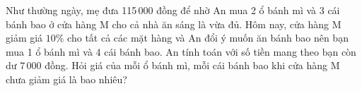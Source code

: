 \begin{bt}[1,0 điểm]
Như thường ngày, mẹ đưa 115\,000 đồng để nhờ An mua 2 ổ bánh mì và 3 cái bánh bao ở cửa hàng M cho cả nhà ăn sáng là vừa đủ. Hôm nay, cửa hàng M giảm giá $10 \%$ cho tất cả các mặt hàng và An đổi ý muốn ăn bánh bao nên bạn mua 1 ổ bánh mì và 4 cái bánh bao. An tính toán với số tiền mang theo bạn còn dư 7\,000 đồng. Hỏi giá của mỗi ổ bánh mì, mỗi cái bánh bao khi cửa hàng M chưa giảm giá là bao nhiêu?
\end{bt}

\begin{bt}
[1,0 điểm] 
\end{bt}
